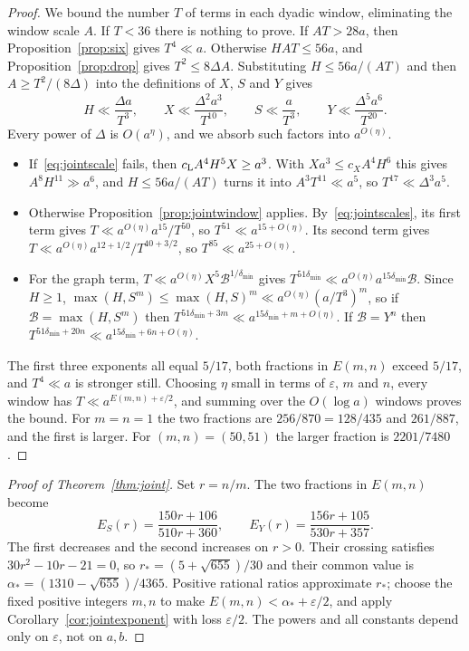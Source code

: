 \documentclass[11pt]{article}
\theoremstyle{definition}
\theoremstyle{remark}
\begin{document}
\begin{proof}
We bound the number $T$ of terms in each dyadic window, eliminating the
window scale $A$. If $T<36$ there is nothing to prove. If $AT>28a$, then
Proposition~\ref{prop:six} gives $T^4\ll a$. Otherwise $HAT\le56a$, and
Proposition~\ref{prop:drop} gives $T^2\le8\Delta A$. Substituting $H\le56a/(AT)$ and then
$A\ge T^2/(8\Delta)$ into the definitions of $X$, $S$ and $Y$ gives
\begin{equation}\label{eq:jointscales}
 H\ll\frac{\Delta a}{T^3},\qquad X\ll\frac{\Delta^2a^3}{T^{10}},\qquad
 S\ll\frac{a}{T^3},\qquad Y\ll\frac{\Delta^5a^6}{T^{20}}.
\end{equation}
Every power of $\Delta$ is $O(a^\eta)$, and we absorb such factors into $a^{O(\eta)}$.
\begin{itemize}
\item If~\eqref{eq:jointscale} fails, then $c_{\rm L}A^4H^5X\ge a^3$. With
$Xa^3\le c_XA^4H^6$ this gives $A^8H^{11}\gg a^6$, and $H\le56a/(AT)$ turns it into
$A^3T^{11}\ll a^5$, so $T^{17}\ll\Delta^3a^5$.
\item Otherwise Proposition~\ref{prop:jointwindow} applies. By~\eqref{eq:jointscales}, its
first term gives $T\ll a^{O(\eta)}a^{15}/T^{50}$, so $T^{51}\ll a^{15+O(\eta)}$. Its second term
gives $T\ll a^{O(\eta)}a^{12+1/2}/T^{40+3/2}$, so $T^{85}\ll a^{25+O(\eta)}$.
\item For the graph term, $T\ll a^{O(\eta)}X^5\mathcal B^{1/\delta_{\min}}$ gives
$T^{51\delta_{\min}}\ll a^{O(\eta)}a^{15\delta_{\min}}\mathcal B$. Since $H\ge1$,
$\max(H,S^m)\le\max(H,S)^m\ll a^{O(\eta)}(a/T^3)^m$, so if $\mathcal B=\max(H,S^m)$ then
$T^{51\delta_{\min}+3m}\ll a^{15\delta_{\min}+m+O(\eta)}$. If $\mathcal B=Y^n$ then
$T^{51\delta_{\min}+20n}\ll a^{15\delta_{\min}+6n+O(\eta)}$.
\end{itemize}
The first three exponents all equal $5/17$, both fractions in $E(m,n)$ exceed $5/17$, and
$T^4\ll a$ is stronger still. Choosing $\eta$ small in terms of $\varepsilon$, $m$ and $n$, every
window has $T\ll a^{E(m,n)+\varepsilon/2}$, and summing over the $O(\log a)$ windows proves
the bound. For $m=n=1$ the two fractions are $256/870=128/435$ and $261/887$, and the first is
larger. For $(m,n)=(50,51)$ the larger fraction is $2201/7480$.
\end{proof}

\begin{proof}[Proof of Theorem~\ref{thm:joint}]
Set $r=n/m$. The two fractions in $E(m,n)$ become
\[
 E_S(r)=\frac{150r+106}{510r+360},\qquad
 E_Y(r)=\frac{156r+105}{530r+357}.
\]
The first decreases and the second increases on $r>0$. Their crossing satisfies
$30r^2-10r-21=0$, so $r_*=(5+\sqrt{655})/30$ and their common value is
$\alpha_*=(1310-\sqrt{655})/4365$.
Positive rational ratios approximate $r_*$; choose the fixed positive integers
$m,n$ to make $E(m,n)<\alpha_*+\varepsilon/2$, and apply
Corollary~\ref{cor:jointexponent} with loss $\varepsilon/2$.
The powers and all constants depend only on $\varepsilon$, not on $a,b$.
\end{proof}
\end{document}
